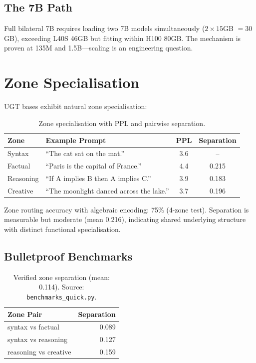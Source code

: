 \documentclass[11pt,a4paper]{article}
\begin{document}
\subsection{The 7B Path}

Full bilateral 7B requires loading two 7B models simultaneously ($2 \times 15$GB $= 30$GB), exceeding L40S 46GB but fitting within H100 80GB. The mechanism is proven at 135M and 1.5B---scaling is an engineering question.

\newpage

\section{Zone Specialisation}

UGT bases exhibit natural zone specialisation:

\begin{table}[h]
\centering
\begin{tabular}{llcc}
\toprule
Zone & Example Prompt & PPL & Separation \\
\midrule
Syntax & ``The cat sat on the mat.'' & 3.6 & -- \\
Factual & ``Paris is the capital of France.'' & 4.4 & 0.215 \\
Reasoning & ``If A implies B then A implies C.'' & 3.9 & 0.183 \\
Creative & ``The moonlight danced across the lake.'' & 3.7 & 0.196 \\
\bottomrule
\end{tabular}
\caption{Zone specialisation with PPL and pairwise separation.}
\end{table}

Zone routing accuracy with algebraic encoding: 75\% (4-zone test). Separation is measurable but moderate (mean 0.216), indicating shared underlying structure with distinct functional specialisation.

\subsection{Bulletproof Benchmarks}

\begin{table}[h]
\centering
\begin{tabular}{lr}
\toprule
Zone Pair & Separation \\
\midrule
syntax vs factual & 0.089 \\
syntax vs reasoning & 0.127 \\
reasoning vs creative & 0.159 \\
\bottomrule
\end{tabular}
\caption{Verified zone separation (mean: 0.114). Source: \texttt{benchmarks\_quick.py}.}
\end{table}
\end{document}
